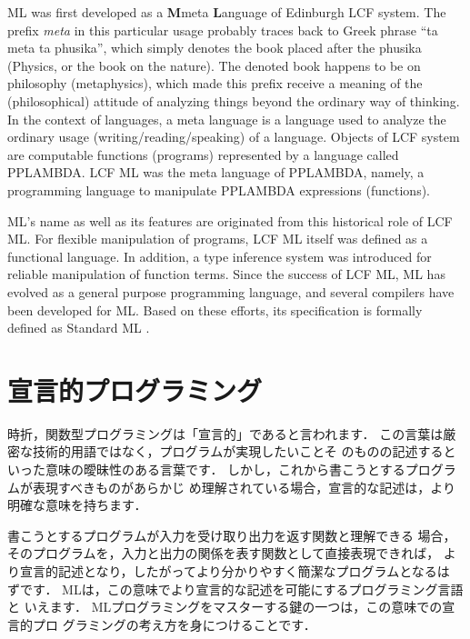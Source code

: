 \documentclass{jbook}
\newif\ifjp
\newcommand{\txt}[2]{#1}
\begin{document}
	ML was first developed as a {\bf M}meta {\bf L}anguage of
Edinburgh LCF\cite{gord79} system.
	The prefix {\em meta\/} in this particular usage probably traces
back to Greek phrase ``ta meta ta phusika'', which  simply denotes the
book placed after the phusika (Physics, or the book on the nature).
	The denoted book happens to be on philosophy (metaphysics), which
made this prefix receive a meaning of the (philosophical) attitude of
analyzing things beyond the ordinary way of thinking.
	In the context of languages, a meta language is a language used
to analyze the ordinary usage (writing/reading/speaking) of a language.
	Objects of LCF system are computable functions (programs)
represented by a language called PPLAMBDA.
	LCF ML was the meta language of PPLAMBDA, namely, a programming
language to manipulate PPLAMBDA expressions (functions).

	ML's name as well as its features are originated from this
historical role of LCF ML. 
	For flexible manipulation of programs, LCF ML itself was defined
as a functional language.
	In addition, a type inference system was introduced for reliable
manipulation of function terms.
	Since the success of LCF ML, ML has evolved as a general purpose
programming language, and several compilers have been developed for ML.
	Based on these efforts, its specification is formally defined as
Standard ML \cite{sml,sml97}.
\fi%


\section{\txt{宣言的プログラミング}{Declarative programming}}
\label{sec:tutorialDeclarative}

\ifjp%
	時折，関数型プログラミングは「宣言的」であると言われます．
	この言葉は厳密な技術的用語ではなく，プログラムが実現したいことそ
のものの記述するといった意味の曖昧性のある言葉です．
	しかし，これから書こうとするプログラムが表現すべきものがあらかじ
め理解されている場合，宣言的な記述は，より明確な意味を持ちます．
	
	書こうとするプログラムが入力を受け取り出力を返す関数と理解できる
場合，そのプログラムを，入力と出力の関係を表す関数として直接表現できれば，
より宣言的記述となり，したがってより分かりやすく簡潔なプログラムとなるは
ずです．
	MLは，この意味でより宣言的な記述を可能にするプログラミング言語と
いえます．
	MLプログラミングをマスターする鍵の一つは，この意味での宣言的プロ
グラミングの考え方を身につけることです．
\end{document}
